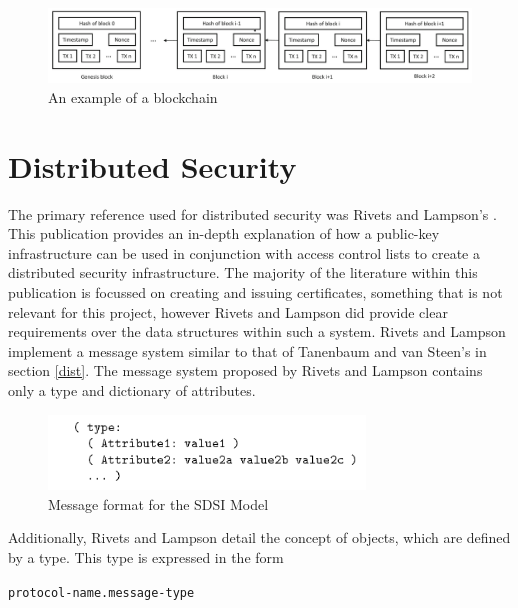 \documentclass[a4paper, 11pt]{report}
\begin{document}
\begin{center}
	\begin{figure}[H]
		\includegraphics[width=\textwidth,keepaspectratio]{NoferBlock}
		\caption{An example of a \gls{blockchain} \cite{blockchain}} 
		\label{fig:blockchain2}
	\end{figure}
\end{center}

\section{Distributed Security}
The primary reference used for distributed security was Rivets and Lampson's  \cite{sdsi}. This publication provides an in-depth explanation of how a public-key infrastructure can be used in conjunction with access control lists to create a distributed security infrastructure. The majority of the literature within this publication is focussed on creating and issuing certificates, something that is not relevant for this project, however Rivets and Lampson did provide clear requirements over the data structures within such a system. Rivets and Lampson implement a message system similar to that of Tanenbaum and van Steen's in section \ref{dist}. The message system proposed by Rivets and Lampson contains only a type and dictionary of attributes.

\begin{figure}[H]
\centering
\includegraphics[height=2cm,keepaspectratio]{distmsg}
\caption{Message format for the SDSI Model \cite{sdsi}} 
\label{fig:sdsimessage}
\end{figure}

Additionally, Rivets and Lampson detail the concept of objects, which are defined by a type. This type is expressed in the form 

\begin{center} 
\texttt{protocol-name.message-type}
\end{center}
\end{document}
